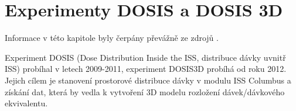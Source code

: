 \chapter{Experimenty DOSIS a DOSIS 3D}
Informace v této kapitole byly čerpány převážně ze zdrojů \cite{dosis,dosis2}.

Experiment DOSIS (Dose Distribution Inside the ISS, distribuce dávky uvnitř ISS) probíhal v letech 2009-2011, experiment DOSIS3D probíhá od roku 2012. Jejich cílem je stanovení prostorové distribuce dávky v modulu ISS Columbus a získání dat, která by vedla k vytvoření 3D modelu rozložení dávek/dávkového ekvivalentu.

